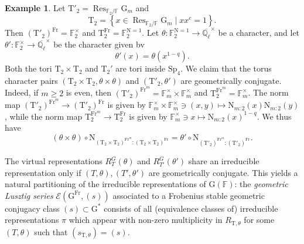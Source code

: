 \documentclass[12pt, reqno]{amsart}
\theoremstyle{definition}
\theoremstyle{definition}
\theoremstyle{definition}
\newtheorem{example}[theorem]{Example}
\newcommand{\multiplicativegroup}[1]{#1^{\times}}
\newcommand{\involution}[1]{#1^{c}}
\newcommand{\FieldNorm}[2]{\mathrm{N}_{#1:#2}}
\newcommand{\aFieldNorm}{\mathrm{N}}
\newcommand{\finiteField}{\mathbb{F}}
\newcommand{\finiteFieldExtension}[1]{\finiteField_{#1}}
\newcommand{\NormOneGroup}[1]{\finiteFieldExtension{#1}^{\aFieldNorm = 1}}
\newcommand{\algebraicClosure}[1]{\overline{#1}}
\newcommand{\Frobenius}{\operatorname{Fr}}
\newcommand{\restrictionOfScalars}[3]{\operatorname{Res}_{#1 \slash #2}{#3}}
\newcommand{\multiplcativeScheme}{\algebraicGroup{G}_m}
\newcommand{\ladicnumbers}{\algebraicClosure{\mathbb{Q}_{\ell}}}
\newcommand{\algebraicGroup}[1]{\boldsymbol{\mathrm{#1}}}
\newcommand{\LusztigSeries}[2]{\mathcal{E}\left(#1, (#2)\right)}
\newcommand{\calvin}[1]{\textcolor{orange}{\sffamily ((CALVIN: #1))}}
\newcommand{\elad}[1]{\textcolor{blue}{\sffamily ((ELAD: #1))}}
\begin{document}
\begin{example}
	Let $\algebraicGroup{T}'_2 = \restrictionOfScalars{\finiteFieldExtension{2}}{\finiteField}{\multiplcativeScheme}$ and $$\algebraicGroup{T}_2 = \left\{x \in \restrictionOfScalars{\finiteFieldExtension{2}}{\finiteField}{\multiplcativeScheme} \mid x \involution{x} = 1 \right\}.$$
	Then $\left(\algebraicGroup{T}'_2\right)^{\Frobenius} = \multiplicativegroup{\finiteFieldExtension{2}}$ and $\algebraicGroup{T}_2^{\Frobenius} = \NormOneGroup{2}$. Let $\theta \colon \NormOneGroup{2} \to \multiplicativegroup{\ladicnumbers}$ be a character, and let $\theta' \colon \multiplicativegroup{\finiteFieldExtension{2}} \to \multiplicativegroup{\ladicnumbers}$ be the character given bv $$\theta'\left(x\right) = \theta\left(x^{1-q}\right).$$
	Both the tori $\algebraicGroup{T}_2 \times \algebraicGroup{T}_2$ and $\algebraicGroup{T}_2'$ are tori inside $\algebraicGroup{Sp}_4$.
	We claim that the torus character pairs $\left(\algebraicGroup{T}_2 \times \algebraicGroup{T}_2, \theta \times \theta\right)$ and $\left(\algebraicGroup{T}'_2, \theta'\right)$ are geometrically conjugate. Indeed, if $m \ge 2$ is even, then $\left(\algebraicGroup{T}'_2\right)^{\Frobenius^{m}} = \multiplicativegroup{\finiteFieldExtension{m}} \times \multiplicativegroup{\finiteFieldExtension{m}}$ and $\algebraicGroup{T}_2^{\Frobenius^m} = \multiplicativegroup{\finiteFieldExtension{m}}$. The norm map $\left(\algebraicGroup{T}'_2\right)^{\Frobenius^{m}} \to \left(\algebraicGroup{T}'_2\right)^{\Frobenius}$ is given by $\multiplicativegroup{\finiteFieldExtension{m}} \times \multiplicativegroup{\finiteFieldExtension{m}} \ni \left(x,y\right) \mapsto \FieldNorm{m}{2}\left(x\right) \FieldNorm{m}{2}\left(y\right)$, while the norm map $\algebraicGroup{T}_2^{\Frobenius^{m}} \to \algebraicGroup{T}_2^{\Frobenius}$ is given by $\multiplicativegroup{\finiteFieldExtension{m}} \ni x \mapsto \FieldNorm{m}{2}\left(x\right)^{1-q}$. We thus have
	$$\left(\theta \times \theta\right) \circ \aFieldNorm_{ \left(\algebraicGroup{T}_2 \times \algebraicGroup{T}_2\right)^{\Frobenius^m} : \left(\algebraicGroup{T}_2 \times \algebraicGroup{T}_2\right)^{\Frobenius} } = \theta' \circ \aFieldNorm_{\left(\algebraicGroup{T}'_2\right)^{\Frobenius^m} \colon \left(\algebraicGroup{T}'_2\right)^{\Frobenius}}.$$
\end{example}

The virtual representations $R_T^G(\theta)$ and $R_{T'}^G(\theta')$ share an irreducible representation only if $(T,\theta),(T',\theta')$ are geometrically conjugate. This yields a natural partitioning of the irreducible representations of $\algebraicGroup{G}(\finiteField)$: the \emph{geometric Lusztig series} $\LusztigSeries{\algebraicGroup{G}^{\Frobenius}}{s}$ associated to a Frobenius stable geometric conjugacy class $(s) \subset \algebraicGroup{G}^*$ consists of all (equivalence classes of) irreducible representations $\pi$ which appear with non-zero multiplicity in $R_{\algebraicGroup{T}, \theta}$ for some $(T,\theta)$ such that $(s_{\algebraicGroup{T},\theta}) = (s)$.
\end{document}
